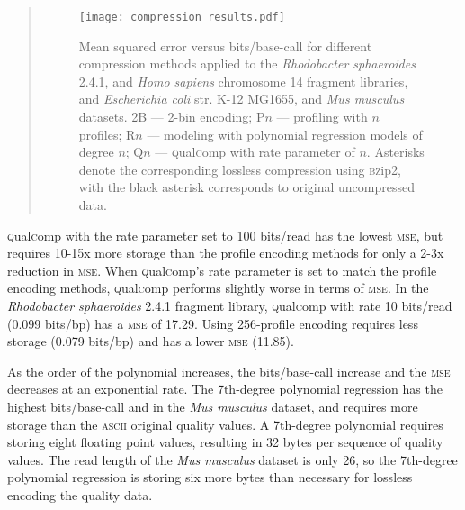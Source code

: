 \documentclass[12pt,\mydriver]{thesis}
\begin{document}
\begin{landscape}
\renewcommand{\baselinestretch}{1}
\small\normalsize
\begin{quote}
\begin{figure}[!tpb]\begin{center}
\texttt{[image: compression\_results.pdf]}
\end{center}
\renewcommand{\baselinestretch}{1}
\small\normalsize
\caption[Mean squared error versus bits/base-call for different
  compression methods applied to the \textit{Rhodobacter sphaeroides}
  2.4.1, and \textit{Homo sapiens} chromosome 14 fragment libraries,
  and \textit{Escherichia coli} str. K-12 MG1655, and \textit{Mus
    musculus} datasets]{Mean squared error versus bits/base-call for different
  compression methods applied to the \textit{Rhodobacter sphaeroides}
  2.4.1, and \textit{Homo sapiens} chromosome 14 fragment libraries,
  and \textit{Escherichia coli} str. K-12 MG1655, and \textit{Mus
    musculus} datasets. 2B --- 2-bin encoding; P$n$ --- profiling
  with $n$ profiles; R$n$ --- modeling with polynomial regression
  models of degree $n$; Q$n$ --- \textsc{q}ual\textsc{c}omp with rate parameter of
  $n$. Asterisks denote the corresponding lossless compression using
  \textsc{bz}ip2, with the black asterisk corresponds to original uncompressed
  data.}
  \label{fig:mse_vs_bpbp}
\end{figure}
\end{quote}
\renewcommand{\baselinestretch}{2}
\small\normalsize
\end{landscape}


\textsc{q}ual\textsc{c}omp with the rate parameter set to 100 bits/read has the lowest
\textsc{mse}, but requires 10-15x more storage than the profile
encoding methods for only a 2-3x reduction in \textsc{mse}. When
\textsc{q}ual\textsc{c}omp's rate parameter is set to match the profile encoding
methods, \textsc{q}ual\textsc{c}omp performs slightly worse in terms of \textsc{mse}.
In the \textit{Rhodobacter sphaeroides} 2.4.1 fragment library,
\textsc{q}ual\textsc{c}omp with rate 10 bits/read (0.099 bits/bp) has a \textsc{mse} of
17.29. Using 256-profile encoding requires less storage (0.079
bits/bp) and has a lower \textsc{mse} (11.85).

As the order of the polynomial increases, the bits/base-call increase
and the \textsc{mse} decreases at an exponential rate. The 7th-degree
polynomial regression has the highest bits/base-call and in the
\textit{Mus musculus} dataset, and requires more storage than the
\textsc{ascii} original quality values. A 7th-degree polynomial
requires storing eight floating point values, resulting in 32 bytes
per sequence of quality values. The read length of the \textit{Mus musculus}
dataset is only 26, so the 7th-degree polynomial regression is storing
six more bytes than necessary for lossless encoding the quality data.
\end{document}
